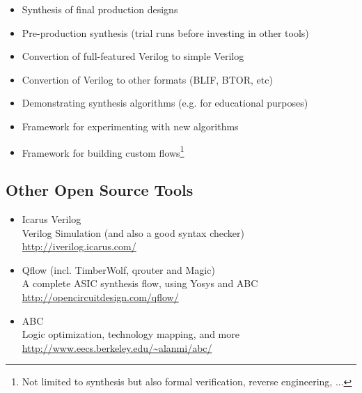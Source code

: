 \begin{frame}{\subsecname}
\begin{itemize}
\item Synthesis of final production designs
\item Pre-production synthesis (trial runs before investing in other tools)
\item Convertion of full-featured Verilog to simple Verilog
\item Convertion of Verilog to other formats (BLIF, BTOR, etc)
\item Demonstrating synthesis algorithms (e.g. for educational purposes)
\item Framework for experimenting with new algorithms
\item Framework for building custom flows\footnote[frame]{Not limited to synthesis
but also formal verification, reverse engineering, ...}
\end{itemize}
\end{frame}


\subsection{Other Open Source Tools}

\begin{frame}{\subsecname}
\begin{itemize}
\item Icarus Verilog \\
\smallskip\hskip1cm{}Verilog Simulation (and also a good syntax checker) \\
\smallskip\hskip1cm{}\url{http://iverilog.icarus.com/}

\bigskip
\item Qflow (incl. TimberWolf, qrouter and Magic) \\
\smallskip\hskip1cm{}A complete ASIC synthesis flow, using Yosys and ABC \\
\smallskip\hskip1cm{}\url{http://opencircuitdesign.com/qflow/}

\bigskip
\item ABC \\
\smallskip\hskip1cm{}Logic optimization, technology mapping, and more \\
\smallskip\hskip1cm{}\url{http://www.eecs.berkeley.edu/~alanmi/abc/}
\end{itemize}
\end{frame}

